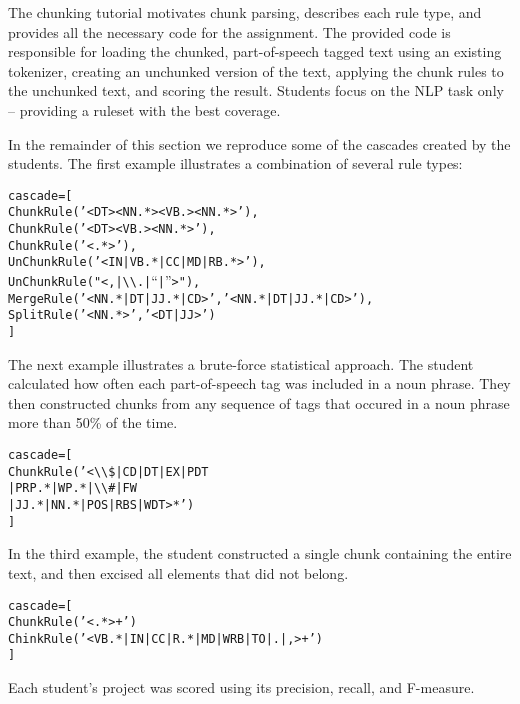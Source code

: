 \documentclass[11pt]{article}
\newenvironment{sv}{\scriptsize\begin{alltt}}{\end{alltt}\normalsize}
\begin{document}
The chunking tutorial motivates chunk parsing, describes each rule
type, and provides all the necessary code for the assignment.  The
provided code is responsible for loading the chunked, part-of-speech
tagged text using an existing tokenizer, creating an unchunked version
of the text, applying the chunk rules to the unchunked text, and
scoring the result.  Students focus on the NLP task only -- providing
a ruleset with the best coverage.

In the remainder of this section we reproduce some of the cascades
created by the students.  The first example illustrates a combination
of several rule types:

\begin{sv}
cascade = [
  ChunkRule('<DT><NN.*><VB.><NN.*>'),
  ChunkRule('<DT><VB.><NN.*>'),
  ChunkRule('<.*>'),
  UnChunkRule('<IN|VB.*|CC|MD|RB.*>'),
  UnChunkRule("<,|{\textbackslash}{\textbackslash}.|``|''>"),
  MergeRule('<NN.*|DT|JJ.*|CD>', '<NN.*|DT|JJ.*|CD>'),
  SplitRule('<NN.*>', '<DT|JJ>')
]
\end{sv}

The next example illustrates a brute-force statistical approach.  The
student calculated how often each part-of-speech tag was included in a
noun phrase.  They then constructed chunks from any sequence of tags
that occured in a noun phrase more than 50\% of the time.

\begin{sv}
cascade = [
  ChunkRule('<{\textbackslash}{\textbackslash}\$|CD|DT|EX|PDT
             |PRP.*|WP.*|{\textbackslash}{\textbackslash}\#|FW
             |JJ.*|NN.*|POS|RBS|WDT>*')
]
\end{sv}

In the third example, the student constructed a single chunk
containing the entire text, and then excised all elements that did not
belong.

\begin{sv}
cascade = [
  ChunkRule('<.*>+')
  ChinkRule('<VB.*|IN|CC|R.*|MD|WRB|TO|.|,>+')
]
\end{sv}

Each student's project was scored using its precision, recall, and
F-measure.

%
\end{document}
